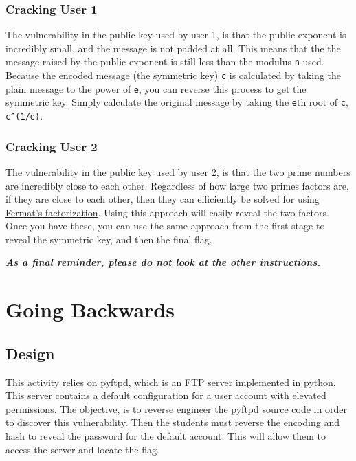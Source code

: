 {                        \subsubsection*{Cracking User 1}
                            The vulnerability in the public key used by user 1, is that the public exponent is incredibly small, and the message is not padded at all. This means that the the message raised by the public exponent is still less than the modulus \lstinline`n` used. Because the encoded message (the symmetric key) \lstinline`c` is calculated by taking the plain message to the power of \lstinline`e`, you can reverse this process to get the symmetric key. Simply calculate the original message by taking the \lstinline`e`th root of \lstinline`c`, \lstinline`c^(1/e)`.
                        \subsubsection*{Cracking User 2}
                            The vulnerability in the public key used by user 2, is that the two prime numbers are incredibly close to each other. Regardless of how large two primes factors are, if they are close to each other, then they can efficiently be solved for using \href{https://en.wikipedia.org/wiki/Fermat%27s_factorization_method}{Fermat's factorization}. Using this approach will easily reveal the two factors. Once you have these, you can use the same approach from the first stage to reveal the symmetric key, and then the final flag.

                    \textbf{\textit{As a final reminder, please do not look at the other instructions.}}
            }
\newpage
\section{Going Backwards}\label{subsec:CTFs-gb}

    \subsection{Design}
        This activity relies on pyftpd, which is an FTP server implemented in python.
        This server contains a default configuration for a user account with elevated permissions.
        The objective, is to reverse engineer the pyftpd source code in order to discover this vulnerability.
        Then the students must reverse the encoding and hash to reveal the password for the default account.
        This will allow them to access the server and locate the flag. 

